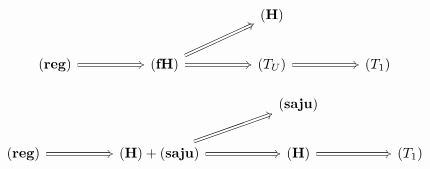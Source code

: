 \begin{equation}
\begin{tikzcd}
	&&&& {\mathbf{(H)}} \\
	{\mathbf{(reg)}} && {\mathbf{(fH)}} && {(T_U)} && {(T_1)}
	\arrow[Rightarrow, from=2-1, to=2-3]
	\arrow[Rightarrow, from=2-3, to=1-5]
	\arrow[Rightarrow, from=2-3, to=2-5]
	\arrow[Rightarrow, from=2-5, to=2-7]
\end{tikzcd}
\end{equation}

\begin{equation}
\begin{tikzcd}
	&&&& {\mathbf{(saju)}} \\
	{\mathbf{(reg)}} && {\mathbf{(H)}+\mathbf{(saju)}} && {\mathbf{(H)}} && {(T_1)}
	\arrow[Rightarrow, from=2-1, to=2-3]
	\arrow[Rightarrow, from=2-3, to=1-5]
	\arrow[Rightarrow, from=2-3, to=2-5]
	\arrow[Rightarrow, from=2-5, to=2-7]
\end{tikzcd}
\end{equation}